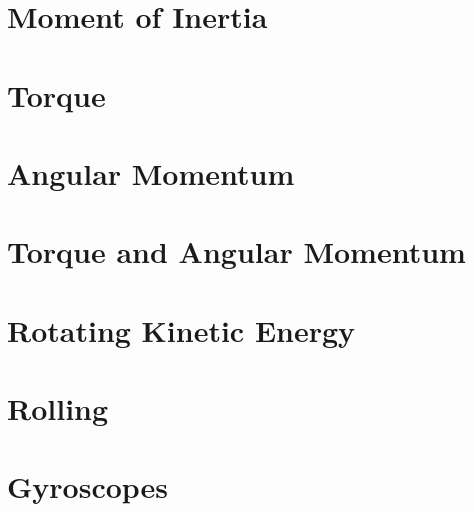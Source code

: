 \documentclass{report}
\begin{document}
\section{Moment of Inertia}
\section{Torque}
\section{Angular Momentum}
\section{Torque and Angular Momentum}
\section{Rotating Kinetic Energy}
\section{Rolling}
\section{Gyroscopes}
\end{document}
